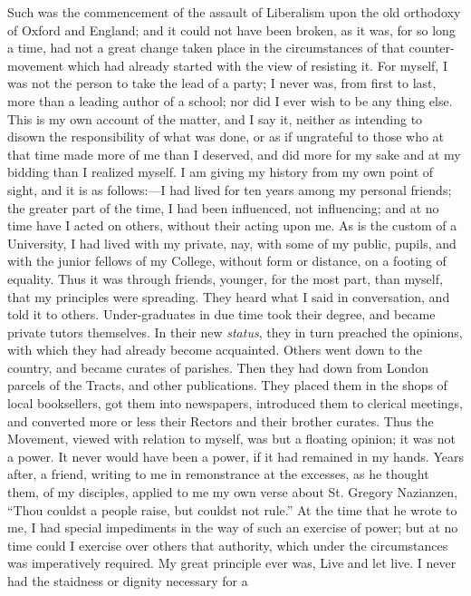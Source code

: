Such was the commencement of the assault of Liberalism upon the old
orthodoxy of Oxford and England; and it could not have been broken, as
it was, for so long a time, had not a great change taken place in
the circumstances of that counter-movement which had already started
with the view of resisting it. For myself, I was not the person to take
the lead of a party; I never was, from first to last, more than a
leading author of a school; nor did I ever wish to be any thing else.
This is my own account of the matter, and I say it, neither as intending
to disown the responsibility of what was done, or as if
ungrateful to those who at that time made more of me than I deserved,
and did more for my sake and at my bidding than I realized myself. I am
giving my history from my own point of sight, and it is as follows:—I
had lived for ten years among my personal friends; the greater part of
the time, I had been influenced, not influencing; and at no time have I
acted on others, without their acting upon me. As is the custom of a
University, I had lived with my private, nay, with some of my public,
pupils, and with the junior fellows of my College, without form or
distance, on a footing of equality. Thus it was through friends,
younger, for the most part, than myself, that my principles were
spreading. They heard what I said in conversation, and told it to
others. Under-graduates in due time took their degree, and became private
tutors themselves. In their new \emph{status}, they in turn
preached the opinions, with which they had already become acquainted. Others went down to the country, and became curates of parishes.
Then they had down from London parcels of the Tracts, and other
publications. They placed them in the shops of local booksellers, got
them into newspapers, introduced them to clerical meetings, and
converted more or less their Rectors and their brother curates. Thus the
Movement, viewed with relation to myself, was but a floating opinion; it
was not a power. It never would have been a power, if it had remained in
my hands. Years after, a friend, writing to me in remonstrance at the
excesses, as he thought them, of my disciples, applied to me my own
verse about St. Gregory Nazianzen, ``Thou couldst a people raise,
but couldst not rule.'' At the time that he wrote to me, I had
special impediments in the way of such an exercise of power; but
at no time could I exercise over others that authority, which under the
circumstances was imperatively required. My great principle ever was,
Live and let live. I never had the staidness or dignity necessary for a
